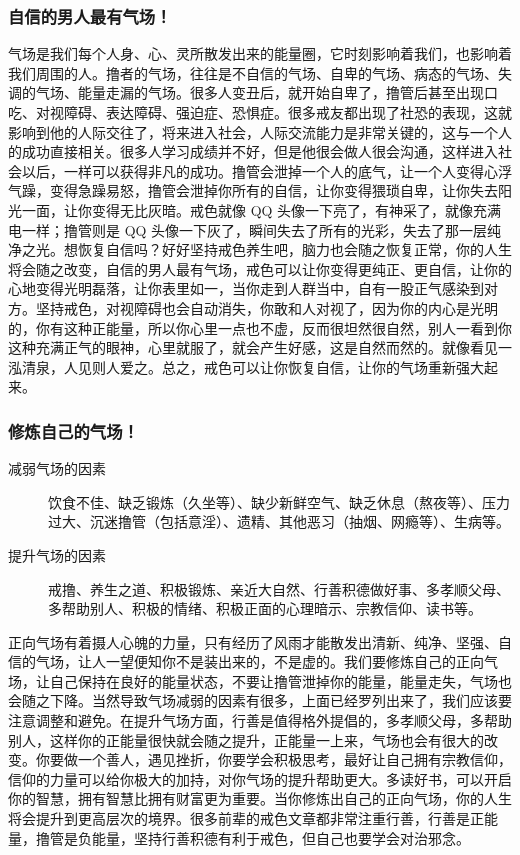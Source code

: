 \subsubsection{自信的男人最有气场！}

气场是我们每个人身、心、灵所散发出来的能量圈，它时刻影响着我们，也影响着我们周围的人。撸者的气场，往往是不自信的气场、自卑的气场、病态的气场、失调的气场、能量走漏的气场。很多人变丑后，就开始自卑了，撸管后甚至出现口吃、对视障碍、表达障碍、强迫症、恐惧症。很多戒友都出现了社恐的表现，这就影响到他的人际交往了，将来进入社会，人际交流能力是非常关键的，这与一个人的成功直接相关。很多人学习成绩并不好，但是他很会做人很会沟通，这样进入社会以后，一样可以获得非凡的成功。撸管会泄掉一个人的底气，让一个人变得心浮气躁，变得急躁易怒，撸管会泄掉你所有的自信，让你变得猥琐自卑，让你失去阳光一面，让你变得无比灰暗。戒色就像 QQ 头像一下亮了，有神采了，就像充满电一样；撸管则是 QQ 头像一下灰了，瞬间失去了所有的光彩，失去了那一层纯净之光。想恢复自信吗？好好坚持戒色养生吧，脑力也会随之恢复正常，你的人生将会随之改变，自信的男人最有气场，戒色可以让你变得更纯正、更自信，让你的心地变得光明磊落，让你表里如一，当你走到人群当中，自有一股正气感染到对方。坚持戒色，对视障碍也会自动消失，你敢和人对视了，因为你的内心是光明的，你有这种正能量，所以你心里一点也不虚，反而很坦然很自然，别人一看到你这种充满正气的眼神，心里就服了，就会产生好感，这是自然而然的。就像看见一泓清泉，人见则人爱之。总之，戒色可以让你恢复自信，让你的气场重新强大起来。

\subsubsection{修炼自己的气场！}

\begin{description}
    \item[减弱气场的因素] 饮食不佳、缺乏锻炼（久坐等）、缺少新鲜空气、缺乏休息（熬夜等）、压力过大、沉迷撸管（包括意淫）、遗精、其他恶习（抽烟、网瘾等）、生病等。
    \item[提升气场的因素] 戒撸、养生之道、积极锻炼、亲近大自然、行善积德做好事、多孝顺父母、多帮助别人、积极的情绪、积极正面的心理暗示、宗教信仰、读书等。
\end{description}

正向气场有着摄人心魄的力量，只有经历了风雨才能散发出清新、纯净、坚强、自信的气场，让人一望便知你不是装出来的，不是虚的。我们要修炼自己的正向气场，让自己保持在良好的能量状态，不要让撸管泄掉你的能量，能量走失，气场也会随之下降。当然导致气场减弱的因素有很多，上面已经罗列出来了，我们应该要注意调整和避免。在提升气场方面，行善是值得格外提倡的，多孝顺父母，多帮助别人，这样你的正能量很快就会随之提升，正能量一上来，气场也会有很大的改变。你要做一个善人，遇见挫折，你要学会积极思考，最好让自己拥有宗教信仰，信仰的力量可以给你极大的加持，对你气场的提升帮助更大。多读好书，可以开启你的智慧，拥有智慧比拥有财富更为重要。当你修炼出自己的正向气场，你的人生将会提升到更高层次的境界。很多前辈的戒色文章都非常注重行善，行善是正能量，撸管是负能量，坚持行善积德有利于戒色，但自己也要学会对治邪念。

